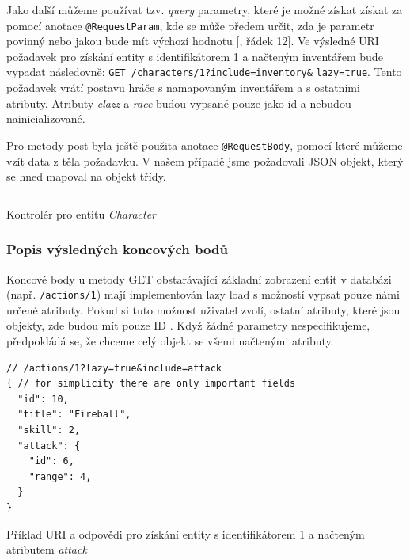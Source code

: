 Jako další můžeme používat tzv. \textit{query} parametry, které je možné získat získat za pomocí anotace \texttt{@RequestParam}, kde se může předem určit, zda je parametr povinný nebo jakou bude mít výchozí hodnotu [, řádek 12]. Ve výsledné URI požadavek pro získání entity s identifikátorem 1 a načteným inventářem bude vypadat následovně: \texttt{GET /characters/1?include=inventory\&} \texttt{lazy=true}. Tento požadavek vrátí postavu hráče s namapovaným inventářem a s ostatními atributy. Atributy \textit{clazz} a \textit{race} 
budou vypsané pouze jako id a nebudou nainicializované.

Pro metody post byla ještě použita anotace \texttt{@RequestBody}, pomocí které můžeme vzít data z těla požadavku. V našem případě jsme požadovali JSON objekt, který se hned mapoval na objekt třídy.

\begin{listing}[h!]
    \inputminted[]{Java}{resources/code/impl/CharacterController.java}
    \caption{Kontrolér pro entitu \textit{Character}}
    \label{code:characterController}
\end{listing}

\subsubsection*{Popis výsledných koncových bodů}\label{sec:impl:endpoints:desc}   %
Koncové body u metody GET obstarávající základní zobrazení entit v databázi (např. \texttt{/actions/1}) mají implementován lazy load  s možností vypsat pouze námi určené atributy. Pokud si tuto možnost uživatel zvolí, ostatní atributy, které jsou objekty, zde budou mít pouze ID . Když žádné parametry nespecifikujeme, předpokládá se, že chceme celý objekt se všemi načtenými atributy.


\begin{listing}[h!]
    \begin{verbatim}
// /actions/1?lazy=true&include=attack 
{ // for simplicity there are only important fields
  "id": 10,
  "title": "Fireball",
  "skill": 2,
  "attack": {
    "id": 6,
    "range": 4,
  }
}
    \end{verbatim}
    \caption{Příklad URI a odpovědi pro získání entity s identifikátorem 1 a načteným atributem \textit{attack}}
    \label{code:action:endpoint:single}
\end{listing}

